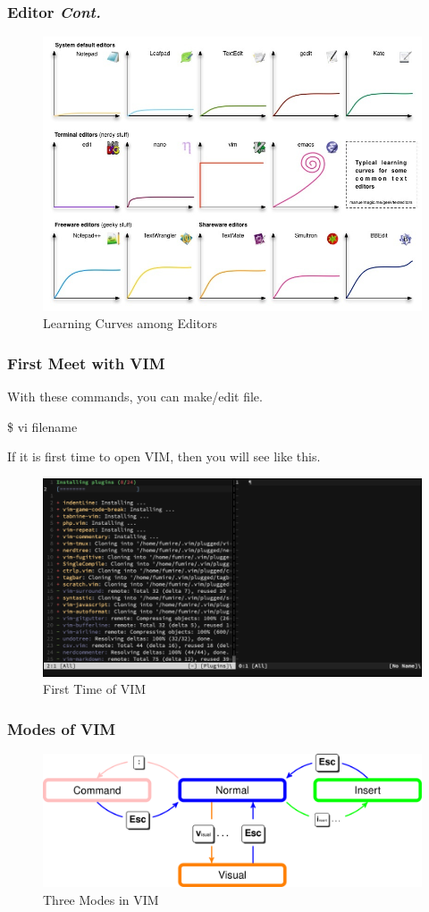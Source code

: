 \documentclass{beamer}
\begin{document}
	\begin{frame}
		\frametitle{Editor \textit{Cont.}}
		\begin{figure}[h!]
			\centering
			\includegraphics[width=0.7 \linewidth]{figures/curves.jpg}
			\caption{Learning Curves among Editors}
		\end{figure}
	\end{frame}

	\begin{frame}
		\frametitle{First Meet with VIM}
		With these commands, you can make/edit file.
		\begin{example}
			\$ vi filename
		\end{example}
	
		If it is first time to open VIM, then you will see like this. 
		\begin{figure}[h!]
			\centering
			\includegraphics[width=0.5 \linewidth]{figures/9.png}
			\caption{First Time of VIM}
		\end{figure}
	\end{frame}

	\begin{frame}
		\frametitle{Modes of VIM}
		\begin{figure}[h!]
			\centering
			\includegraphics[width=0.7 \linewidth]{figures/modes.png}
			\caption{Three Modes in VIM}
		\end{figure}
	\end{frame}
	
\end{document}
